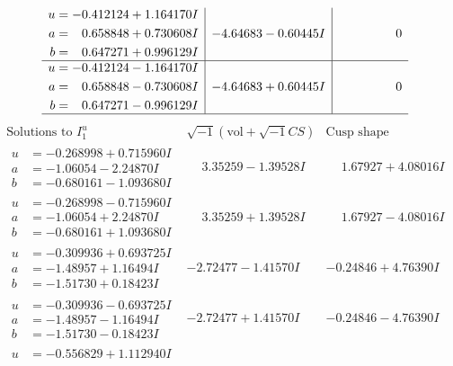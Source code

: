 \documentclass[1p]{elsarticle_modified}
\theoremstyle{definition}
\newcommand{\I}{\sqrt{-1}}
\begin{document}
$$\begin{array}{c|c|c}
\begin{aligned}
u &= -0.412124 + 1.164170 I \\
a &= \phantom{-}0.658848 + 0.730608 I \\
b &= \phantom{-}0.647271 + 0.996129 I\end{aligned}
 & -4.64683 - 0.60445 I & \phantom{-0.000000 } 0 \\ \hline\begin{aligned}
u &= -0.412124 - 1.164170 I \\
a &= \phantom{-}0.658848 - 0.730608 I \\
b &= \phantom{-}0.647271 - 0.996129 I\end{aligned}
 & -4.64683 + 0.60445 I & \phantom{-0.000000 } 0\\
 \hline 
 \end{array}$$\newpage$$\begin{array}{c|c|c}  
\text{Solutions to }I^u_{1}& \I (\text{vol} + \sqrt{-1}CS) & \text{Cusp shape}\\
 \hline 
\begin{aligned}
u &= -0.268998 + 0.715960 I \\
a &= -1.06054 - 2.24870 I \\
b &= -0.680161 - 1.093680 I\end{aligned}
 & \phantom{-}3.35259 - 1.39528 I & \phantom{-}1.67927 + 4.08016 I \\ \hline\begin{aligned}
u &= -0.268998 - 0.715960 I \\
a &= -1.06054 + 2.24870 I \\
b &= -0.680161 + 1.093680 I\end{aligned}
 & \phantom{-}3.35259 + 1.39528 I & \phantom{-}1.67927 - 4.08016 I \\ \hline\begin{aligned}
u &= -0.309936 + 0.693725 I \\
a &= -1.48957 + 1.16494 I \\
b &= -1.51730 + 0.18423 I\end{aligned}
 & -2.72477 - 1.41570 I & -0.24846 + 4.76390 I \\ \hline\begin{aligned}
u &= -0.309936 - 0.693725 I \\
a &= -1.48957 - 1.16494 I \\
b &= -1.51730 - 0.18423 I\end{aligned}
 & -2.72477 + 1.41570 I & -0.24846 - 4.76390 I \\ \hline\begin{aligned}
u &= -0.556829 + 1.112940 I \\

\end{aligned}
\end{array}$$
\end{document}
